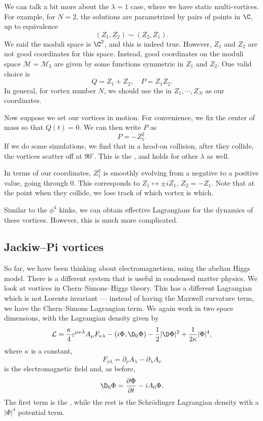 \documentclass[a4paper]{article}
\begin{document}
We can talk a bit more about the $\lambda = 1$ case, where we have static multi-vortices. For example, for $N = 2$, the solutions are parametrized by pairs of points in $\C$, up to equivalence
\[
  (Z_1, Z_2) \sim (Z_2, Z_1).
\]
We said the moduli space is $\C^2$, and this is indeed true. However, $Z_1$ and $Z_2$ are not good coordinates for this space. Instead, good coordinates on the moduli space $\mathcal{M} = \mathcal{M}_2$ are given by some functions symmetric in $Z_1$ and $Z_2$. One valid choice is
\[
  Q = Z_1 + Z_2,\quad P = Z_1 Z_2.
\]
In general, for vortex number $N$, we should use the  in $Z_1, \cdots, Z_N$ as our coordinates.

Now suppose we set our vortices in motion. For convenience, we fix the center of mass so that $Q(t) = 0$. We can then write $P$ as
\[
  P = - Z_1^2.
\]
If we do some simulations, we find that in a head-on collision, after they collide, the vortices scatter off at $90^\circ$. This is the , and holds for other $\lambda$ as well.

In terms of our coordinates, $Z_1^2$ is smoothly evolving from a negative to a positive value, going through $0$. This corresponds to $Z_1 \mapsto \pm i Z_1$, $Z_2 = - Z_1$. Note that at the point when they collide, we lose track of which vortex is which.

Similar to the $\phi^4$ kinks, we can obtain effective Lagrangians for the dynamics of these vortices. However, this is much more complicated.

\subsection{Jackiw--Pi vortices}
So far, we have been thinking about electromagnetism, using the abelian Higgs model. There is a different system that is useful in condensed matter physics. We look at vortices in Chern--Simons--Higgs theory. This has a different Lagrangian which is not Lorentz invariant --- instead of having the Maxwell curvature term, we have the Chern--Simons Lagrangian term. We again work in two space dimensions, with the Lagrangian density given by
\[
  \mathcal{L} = \frac{\kappa}{4} \varepsilon^{\mu\nu\lambda} A_\mu F_{\nu\lambda} - (i \Phi, \D_0 \Phi) - \frac{1}{2} | \D \Phi|^2 + \frac{1}{2\kappa} |\Phi|^4,
\]
where $\kappa$ is a constant,
\[
  F_{\nu \lambda} = \partial_\nu A_\lambda - \partial_\lambda A_\nu
\]
is the electromagnetic field and, as before,
\[
  \D_0 \Phi = \frac{\partial \Phi}{\partial t} - i A_0 \Phi.
\]
The first term is the , while the rest is the Schr\"odinger Lagrangian density with a $|\Phi|^4$ potential term.
\end{document}
